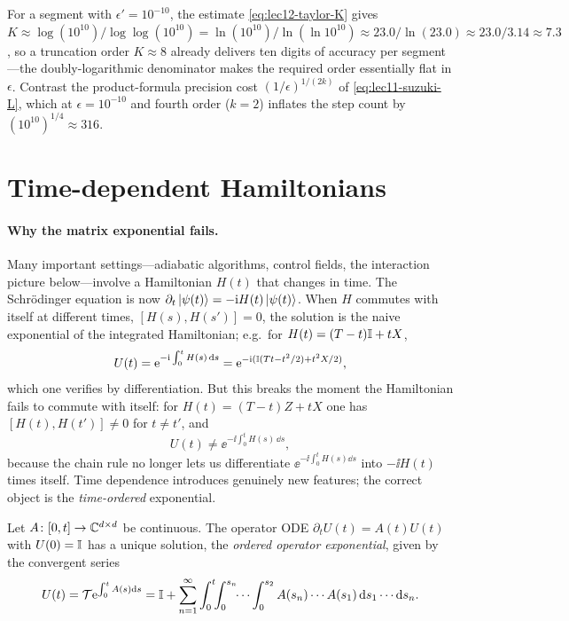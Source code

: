 \begin{example}[{Taylor order at $\epsilon=10^{-10}$}]
\label{exa:lec12-taylor-order}
For a segment with $\epsilon'=10^{-10}$, the estimate \eqref{eq:lec12-taylor-K} gives
$K\approx\log(10^{10})/\log\log(10^{10})=\ln(10^{10})/\ln(\ln 10^{10})
\approx23.0/\ln(23.0)\approx23.0/3.14\approx7.3$, so a truncation order $K\approx8$ already
delivers ten digits of accuracy per segment---the doubly-logarithmic denominator makes the
required order essentially flat in $\epsilon$. Contrast the product-formula precision cost
$(1/\epsilon)^{1/(2k)}$ of \eqref{eq:lec11-suzuki-L}, which at $\epsilon=10^{-10}$ and
fourth order ($k=2$) inflates the step count by $(10^{10})^{1/4}\approx316$.
\end{example}

\section{Time-dependent Hamiltonians}
\label{sec:lec12-3}

\paragraph{Why the matrix exponential fails.}
Many important settings---adiabatic algorithms, control fields, the interaction picture
below---involve a Hamiltonian $H(t)$ that changes in time. The Schr\"odinger equation is
now $\partial_t\ket{\psi(t)}=-\mathrm{i} H(t)\ket{\psi(t)}$. When $H$ commutes with itself at
different times, $[H(s),H(s')]=0$, the solution is the naive exponential of the integrated
Hamiltonian; e.g.\ for $H(t)=(T-t)\mathbb{I}+tX$,
\begin{equation}
  U(t)=\mathrm{e}^{-\mathrm{i}\int_0^t H(s)\,\mathrm{d} s}
      =\mathrm{e}^{-\mathrm{i}(\mathbb{I}(Tt-t^2/2)+t^2X/2)},
  \label{eq:lec12-td-commuting}
\end{equation}
which one verifies by differentiation. But this breaks the moment the Hamiltonian fails to
commute with itself: for $H(t)=(T-t)Z+tX$ one has $[H(t),H(t')]\neq0$ for $t\neq t'$, and
\begin{equation}
  U(t)\neq\ee^{-\ii\int_0^t H(s)\,\dd s},
  \label{eq:lec12-td-noncommuting}
\end{equation}
because the chain rule no longer lets us differentiate $\ee^{-\ii\int_0^tH(s)\dd s}$ into
$-\ii H(t)$ times itself. Time dependence introduces genuinely new features; the correct
object is the \emph{time-ordered} exponential.

\begin{theorem}
\label{thm:lec12-dyson}
Let $A\colon[0,t]\to\mathbb{C}^{d\times d}$ be continuous. The operator ODE
$\partial_t U(t)=A(t)U(t)$ with $U(0)=\mathbb{I}$ has a unique solution, the \emph{ordered
operator exponential}, given by the convergent series
\begin{equation}
  U(t)=\mathcal T\mathrm{e}^{\int_0^tA(s)\mathrm{d} s}
  =\mathbb{I}+\sum_{n=1}^{\infty}\int_0^t\!\!\int_0^{s_n}\!\!\cdots\int_0^{s_2}
    A(s_n)\cdots A(s_1)\,\mathrm{d} s_1\cdots\mathrm{d} s_n.
  \label{eq:lec12-dyson-series}
\end{equation}
\end{theorem}

